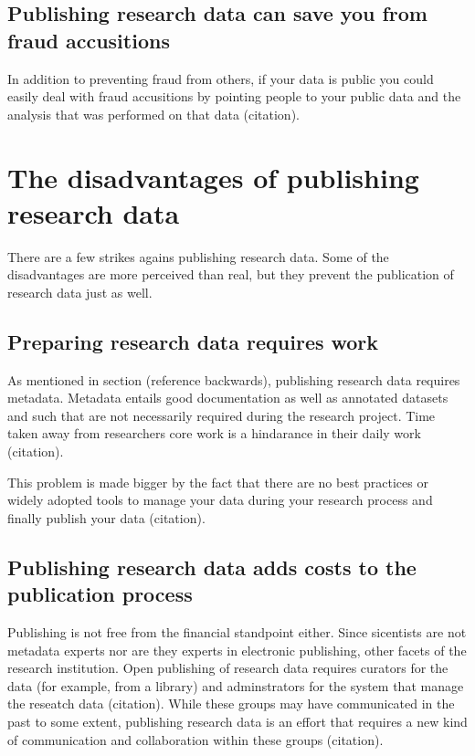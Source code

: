 \subsection{Publishing research data can save you from fraud accusitions}

In addition to preventing fraud from others, if your data is public you could
easily deal with fraud accusitions by pointing people to your public data and
the analysis that was performed on that data (citation).

\section{The disadvantages of publishing research data}

There are a few strikes agains publishing research data. Some of the
disadvantages are more perceived than real, but they prevent the publication
of research data just as well.

\subsection{Preparing research data requires work}

As mentioned in section (reference backwards), publishing research data
requires metadata. Metadata entails good documentation as well as annotated
datasets and such that are not necessarily required during the research
project. Time taken away from researchers core work is a hindarance in their
daily work (citation).

This problem is made bigger by the fact that there are no best practices or
widely adopted tools to manage your data during your research process and
finally publish your data (citation).

\subsection{Publishing research data adds costs to the publication process}

Publishing is not free from the financial standpoint either. Since sicentists
are not metadata experts nor are they experts in electronic publishing, other
facets of the research institution. Open publishing of research data requires
curators for the data (for example, from a library) and adminstrators for the
system that manage the reseatch data (citation). While these groups may have
communicated in the past to some extent, publishing research data is an effort
that requires a new kind of communication and collaboration within these groups
(citation).

